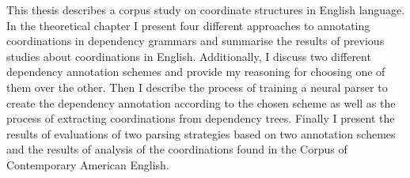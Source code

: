 This thesis describes a corpus study on coordinate structures in English language. In the theoretical chapter I present four different approaches to annotating coordinations in dependency grammars and summarise the results of previous studies about coordinations in English. Additionally, I discuss two different dependency annotation schemes and provide my reasoning for choosing one of them over the other. Then I describe the process of training a neural parser to create the dependency annotation according to the chosen scheme as well as the process of extracting coordinations from dependency trees. Finally I present the results of evaluations of two parsing strategies based on two annotation schemes and the results of analysis of the coordinations found in the Corpus of Contemporary American English. 
